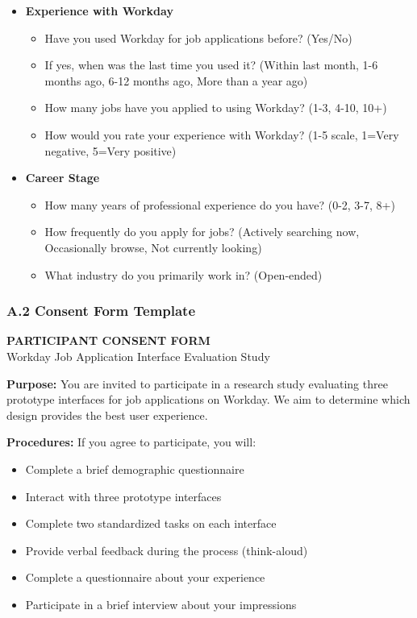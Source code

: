 \documentclass[
	letterpaper, %
]{jdf}
\begin{document}
\begin{sloppypar}
\begin{itemize}
    \item \textbf{Experience with Workday}
    \begin{itemize}
        \item Have you used Workday for job applications before? (Yes/No)
        \item If yes, when was the last time you used it? (Within last month, 1-6 months ago, 6-12 months ago, More than a year ago)
        \item How many jobs have you applied to using Workday? (1-3, 4-10, 10+)
        \item How would you rate your experience with Workday? (1-5 scale, 1=Very negative, 5=Very positive)
    \end{itemize}
    
    \item \textbf{Career Stage}
    \begin{itemize}
        \item How many years of professional experience do you have? (0-2, 3-7, 8+)
        \item How frequently do you apply for jobs? (Actively searching now, Occasionally browse, Not currently looking)
        \item What industry do you primarily work in? (Open-ended)
    \end{itemize}
\end{itemize}

\subsubsection{A.2 Consent Form Template}

\begin{center}
\textbf{PARTICIPANT CONSENT FORM}\\
Workday Job Application Interface Evaluation Study
\end{center}

\textbf{Purpose:} You are invited to participate in a research study evaluating three prototype interfaces for job applications on Workday. We aim to determine which design provides the best user experience.

\textbf{Procedures:} If you agree to participate, you will:
\begin{itemize}
    \item Complete a brief demographic questionnaire
    \item Interact with three prototype interfaces
    \item Complete two standardized tasks on each interface
    \item Provide verbal feedback during the process (think-aloud)
    \item Complete a questionnaire about your experience
    \item Participate in a brief interview about your impressions
\end{itemize}


\end{sloppypar}
\end{document}
